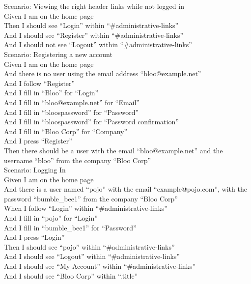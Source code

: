 \documentclass[12pt]{article}
\begin{document}
Scenario: Viewing the right header links while not logged in  \\
  Given I am on the home page \\
  Then I should see ``Login'' within ``\#administrative-links'' \\
  And I should see ``Register'' within ``\#administrative-links'' \\
  And I should not see ``Logout'' within ``\#administrative-links'' \\

Scenario: Registering a new account \\
  Given I am on the home page \\
  And there is no user using the email address ``bloo@example.net'' \\
  And I follow ``Register'' \\
  And I fill in ``Bloo'' for ``Login'' \\
  And I fill in ``bloo@example.net'' for ``Email'' \\
  And I fill in ``bloospassword'' for ``Password'' \\
  And I fill in ``bloospassword'' for ``Password confirmation'' \\
  And I fill in ``Bloo Corp'' for ``Company'' \\
  And I press ``Register'' \\
  Then there should be a user with the email ``bloo@example.net'' and the username ``bloo'' from the company ``Bloo Corp'' \\

Scenario: Logging In \\
  Given I am on the home page \\
  And there is a user named ``pojo'' with the email ``example@pojo.com'', with the password ``bumble\_bee1'' from the company ``Bloo Corp'' \\
  When I follow ``Login'' within ``\#administrative-links'' \\
  And I fill in ``pojo'' for ``Login'' \\
  And I fill in ``bumble\_bee1'' for ``Password'' \\
  And I press ``Login'' \\
  Then I should see ``pojo'' within ``\#administrative-links'' \\
  And I should see ``Logout'' within ``\#administrative-links'' \\
  And I should see ``My Account'' within ``\#administrative-links'' \\
  And I should see ``Bloo Corp'' within ``.title'' \\
\end{document}
